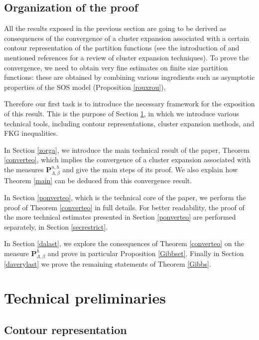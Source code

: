 \documentclass[10pt]{amsart}
\numberwithin{equation}{section}
\theoremstyle{plain}
\theoremstyle{definition}
\newcommand{\bP}{{\ensuremath{\mathbf P}} }
\newcommand{\gb}{\beta}
\newcommand{\gL}{\Lambda}
\begin{document}
\subsection{Organization of the proof}

All the results exposed in the previous section are going to be derived as consequences of the
convergence of a cluster expansion associated with a certain contour representation of the partition functions (see the introduction of \cite{cf:BFP} and mentioned references
for a review of cluster expansion techniques).
To prove the convergence, we need to obtain very fine estimates on finite size partition functions: these are obtained by combining various ingredients such as
asymptotic properties of the SOS model (Proposition \ref{rouxrou}),

Therefore our first task is to introduce the necessary framework for the exposition of this result.
This is the purpose of Section \ref{tools}, in which we introduce various technical tools, including contour representations,
cluster expansion methods, and FKG inequalities.

In Section \ref{zorga}, we introduce the main technical result of the paper, Theorem \ref{converteo}, which implies the convergence of a cluster expansion associated with the measures
$\bP^{n,h}_{\gL,\gb}$
and give the main steps of its proof.
We also explain how Theorem \ref{main} can be deduced from this convergence result.

In Section \ref{ponverteo}, which is the technical core of the paper, we perform the proof of Theorem \ref{converteo} in full details.
For better readability, the proof of the more technical estimates presented in Section \ref{ponverteo} are performed separately, in Section \ref{secrestrict}.

In Section \ref{dalast}, we explore the consequences of Theorem \ref{converteo} on the measure $\bP^h_{\gL,\gb}$ and prove in particular Proposition \ref{Gibbset}.
Finally in Section \ref{daverylast} we prove the remaining statements of Theorem \ref{Gibbs}.

\section{Technical preliminaries}\label{tools}

\subsection{Contour representation}\label{contour}
\end{document}
